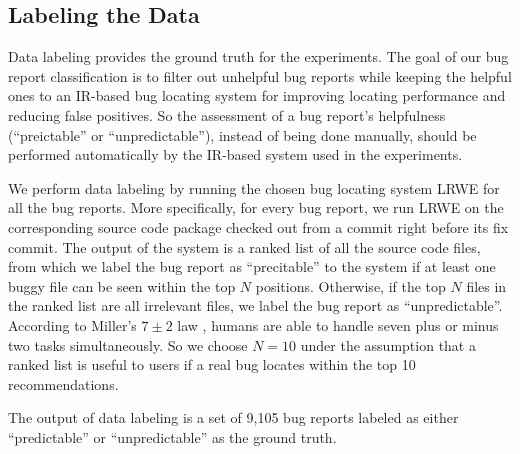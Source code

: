\subsection{Labeling the Data}
\label{sec:labeling the data}
Data labeling provides the ground truth for the experiments. The goal of our bug report classification is to filter out unhelpful bug reports while keeping the helpful ones to an IR-based bug locating system for improving locating performance and reducing false positives. So the assessment of a bug report's helpfulness (``preictable'' or ``unpredictable''), instead of being done manually, should be performed automatically by the IR-based system used in the experiments.

We perform data labeling by running the chosen bug locating system LRWE for all the bug reports. More specifically, for every bug report, we run LRWE on the corresponding source code package checked out from a commit right before its fix commit. The output of the system is a ranked list of all the source code files, from which we label the bug report as ``precitable'' to the system if at least one buggy file can be seen within the top $N$ positions. Otherwise, if the top $N$ files in the ranked list are all irrelevant files, we label the bug report as ``unpredictable''. According to Miller's $7\pm2$ law \cite{mil56}, humans are able to handle seven plus or minus two tasks simultaneously. So we choose $N=10$ under the assumption that a ranked list is useful to users if a real bug locates within the top 10 recommendations.

The output of data labeling is a set of 9,105 bug reports labeled as either ``predictable'' or ``unpredictable'' as the ground truth.

